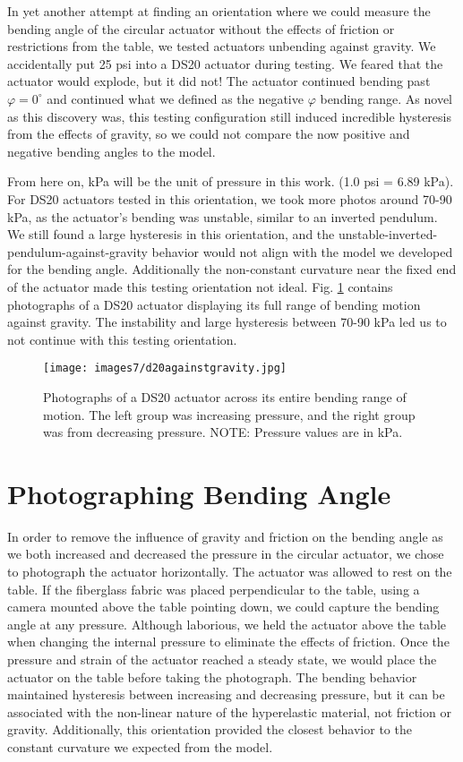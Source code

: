 In yet another attempt at finding an orientation where we could measure the bending angle of the circular actuator without the effects of friction or restrictions from the table, we tested actuators unbending against gravity. We accidentally put 25 psi into a DS20 actuator during testing. We feared that the actuator would explode, but it did not! The actuator continued bending past $\varphi=0^\circ$ and continued what we defined as the negative $\varphi$ bending range. As novel as this discovery was, this testing configuration still induced incredible hysteresis from the effects of gravity, so we could not compare the now positive and negative bending angles to the model. 

From here on, kPa will be the unit of pressure in this work. (1.0 psi = 6.89 kPa). For DS20 actuators tested in this orientation, we took more photos around 70-90 kPa, as the actuator's bending was unstable, similar to an inverted pendulum. We still found a large hysteresis in this orientation, and the unstable-inverted-pendulum-against-gravity behavior would not align with the model we developed for the bending angle. Additionally the non-constant curvature near the fixed end of the actuator made this testing orientation not ideal. Fig. \ref{fig:d20againstgravity} contains photographs of a DS20 actuator displaying its full range of bending motion against gravity. The instability and large hysteresis between 70-90 kPa led us to not continue with this testing orientation. 

\begin{figure}[h]
    \centering
     \texttt{[image: images7/d20againstgravity.jpg]}
    \caption{Photographs of a DS20 actuator across its entire bending range of motion. The left group was increasing pressure, and the right group was from decreasing pressure. NOTE: Pressure values are in kPa.}
    \label{fig:d20againstgravity}
\end{figure}

\clearpage
\section{Photographing Bending Angle}

In order to remove the influence of gravity and friction on the bending angle as we both increased and decreased the pressure in the circular actuator, we chose to photograph the actuator horizontally. The actuator was allowed to rest on the table. If the fiberglass fabric was placed perpendicular to the table, using a camera mounted above the table pointing down, we could capture the bending angle at any pressure. Although laborious, we held the actuator above the table when changing the internal pressure to eliminate the effects of friction. Once the pressure and strain of the actuator reached a steady state, we would place the actuator on the table before taking the photograph. The bending behavior maintained hysteresis between increasing and decreasing pressure, but it can be associated with the non-linear nature of the hyperelastic material, not friction or gravity. Additionally, this orientation provided the closest behavior to the constant curvature we expected from the model. 

